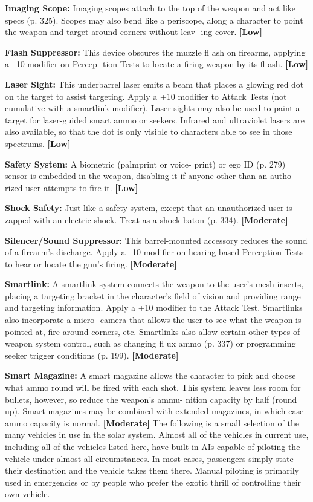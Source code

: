 \textbf{Imaging Scope:} Imaging scopes attach to the top of 
the weapon and act like specs (p. 325). Scopes may 
also bend like a periscope, along a character to point 
the weapon and target around corners without leav-
ing cover. \textbf{[Low]}

\textbf{Flash Suppressor:} This device obscures the muzzle 
fl ash on firearms, applying a –10 modifier on Percep-
tion Tests to locate a firing weapon by its fl ash. \textbf{[Low]}

\textbf{Laser Sight:} This underbarrel laser emits a beam 
that places a glowing red dot on the target to assist 
targeting. Apply a +10 modifier to Attack Tests (not 
cumulative with a smartlink modifier). Laser sights 
may also be used to paint a target for laser-guided 
smart ammo or seekers. Infrared and ultraviolet lasers 
are also available, so that the dot is only visible to 
characters able to see in those spectrums. \textbf{[Low]}

\textbf{Safety System: }A biometric (palmprint or voice-
print) or ego ID (p. 279) sensor is embedded in the 
weapon, disabling it if anyone other than an autho-
rized user attempts to fire it. \textbf{[Low]}

\textbf{Shock Safety:} Just like a safety system, except that 
an unauthorized user is zapped with an electric shock. 
Treat as a shock baton (p. 334). \textbf{[Moderate]}

\textbf{Silencer/Sound Suppressor:} This barrel-mounted 
accessory reduces the sound of a firearm's discharge. 
Apply a –10 modifier on hearing-based Perception 
Tests to hear or locate the gun's firing. \textbf{[Moderate]}

\textbf{Smartlink:} A smartlink system connects the weapon 
to the user's mesh inserts, placing a targeting bracket 
in the character's field of vision and providing range 
and targeting information. Apply a +10 modifier to 
the Attack Test. Smartlinks also incorporate a micro-
camera that allows the user to see what the weapon 
is pointed at, fire around corners, etc. Smartlinks also 
allow certain other types of weapon system control, 
such as changing fl ux ammo (p. 337) or programming 
seeker trigger conditions (p. 199). \textbf{[Moderate]}

\textbf{Smart Magazine:} A smart magazine allows the 
character to pick and choose what ammo round will 
be fired with each shot. This system leaves less room 
for bullets, however, so reduce the weapon's ammu-
nition capacity by half (round up). Smart magazines 
may be combined with extended magazines, in which 
case ammo capacity is normal. \textbf{[Moderate]}
The following is a small selection of the many vehicles 
in use in the solar system. Almost all of the vehicles 
in current use, including all of the vehicles listed here, 
have built-in AIs capable of piloting the vehicle under 
almost all circumstances. In most cases, passengers 
simply state their destination and the vehicle takes 
them there. Manual piloting is primarily used in 
emergencies or by people who prefer the exotic thrill 
of controlling their own vehicle.

